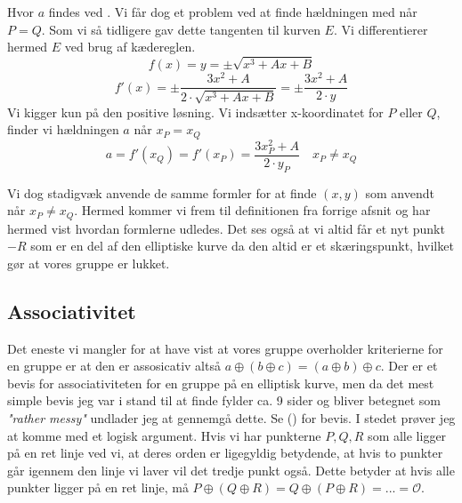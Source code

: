 Hvor $a$ findes ved . Vi får dog et problem ved at finde hældningen med  når $P=Q$. Som vi så tidligere gav dette tangenten til kurven $E$. Vi differentierer hermed $E$ ved brug af kædereglen.
$$f(x) = y = \pm \sqrt{x^3 + Ax +B}$$
$$ f'(x) = \pm \frac{3x^2 +A}{2\cdot \sqrt{x^3+Ax+B}}=\pm \frac{3x^2 +A}{2\cdot y}$$
Vi kigger kun på den positive løsning. Vi indsætter x-koordinatet for $P$ eller $Q$, finder vi hældningen $a$ når $x_P=x_Q$
\begin{equation}
    a = f'(x_Q)=f'(x_P)= \frac{3x_{P}^2 +A}{2\cdot y_P} \quad x_P \neq x_Q
\end{equation}

Vi dog stadigvæk anvende de samme formler for at finde $(x, y)$ som anvendt når $x_P \neq x_Q$. Hermed kommer vi frem til definitionen fra forrige afsnit og har hermed vist hvordan formlerne udledes. Det ses også at vi altid får et nyt punkt $-R$ som er en del af den elliptiske kurve da den altid er et skæringspunkt, hvilket gør at vores gruppe er lukket. 

\subsection{Associativitet}
Det eneste vi mangler for at have vist at vores gruppe overholder kriterierne for en gruppe er at den er assosicativ altså $a\oplus(b\oplus c)=(a\oplus b)\oplus c$. Der er et bevis for associativiteten for en gruppe på en elliptisk kurve, men da det mest simple bevis jeg var i stand til at finde fylder ca. 9 sider og bliver betegnet som \textit{"rather messy"} undlader jeg at gennemgå dette. Se (\cite{stefanfriedel2017}) for bevis. I stedet prøver jeg at komme med et logisk argument. 
Hvis vi har punkterne $P,Q,R$ som alle ligger på en ret linje ved vi, at deres orden er ligegyldig betydende, at hvis to punkter går igennem den linje vi laver vil det tredje punkt også. Dette  betyder at hvis alle punkter ligger på en ret linje, må $P\oplus (Q\oplus R)=Q\oplus (P\oplus R)=...=\mathcal{O}$. 


